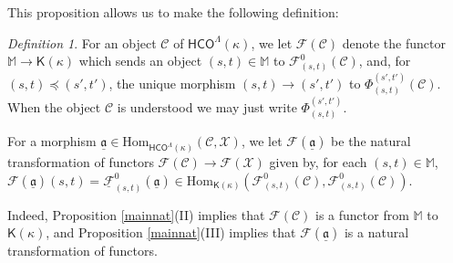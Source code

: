 \documentclass[11pt]{amsart}
\theoremstyle{definition}
\theoremstyle{remark}
\newtheorem{dfn}[theorem]{Definition}
\numberwithin{equation}{section}
\begin{document}
This proposition allows us to make the following definition:

\begin{dfn}\label{fdef}
	For an object $\mathcal{C}$ of $\mathsf{HCO}^{\Lambda}(\kappa)$, we let $\mathcal{F}(\mathcal{C})$ denote the functor $\mathbb{M}\to \mathsf{K}(\kappa)$ which sends an object $(s,t)\in\mathbb{M}$ to $\mathcal{F}^{0}_{(s,t)}(\mathcal{C})$, and, for $(s,t)\preceq (s',t')$, the unique morphism $(s,t)\to (s',t')$ to $\Phi_{(s,t)}^{(s',t')}(\mathcal{C})$.  When the object $\mathcal{C}$ is understood we may just write $\Phi_{(s,t)}^{(s',t')}$.
	
	For a morphism $\underline{\mathfrak{a}}\in \mathrm{Hom}_{\mathsf{HCO}^{\Lambda}(\kappa)}(\mathcal{C},\mathcal{X})$, we let $\mathcal{F}(\underline{\mathfrak{a}})$ be the natural transformation of functors $\mathcal{F}(\mathcal{C})\to\mathcal{F}(\mathcal{X})$ given by, for each $(s,t)\in\mathbb{M}$, $\mathcal{F}(\underline{\mathfrak{a}})(s,t)=\underline{\mathcal{F}}_{(s,t)}^{0}(\underline{\mathfrak{a}})\in \mathrm{Hom}_{\mathsf{K}(\kappa)}(\mathcal{F}^{0}_{(s,t)}(\mathcal{C}),\mathcal{F}^{0}_{(s,t)}(\mathcal{C}))$.
\end{dfn}

Indeed, Proposition \ref{mainnat}(II) implies that $\mathcal{F}(\mathcal{C})$ is  a functor from $\mathbb{M}$ to $\mathsf{K}(\kappa)$, and Proposition \ref{mainnat}(III) implies that $\mathcal{F}(\underline{\mathfrak{a}})$ is a natural transformation of functors.
\end{document}
